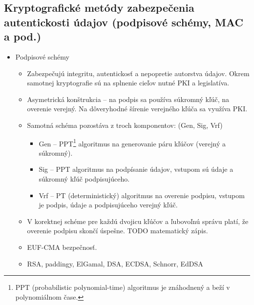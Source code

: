\documentclass[12pt,a4paper]{article}
\begin{document}
{    \subsection{Kryptografické metódy zabezpečenia autentickosti údajov (podpisové schémy, MAC a pod.)}
    \begin{itemize}
        \item Podpisové schémy
        \begin{itemize}
            \item Zabezpečujú integritu, autentickosť a nepopretie autorstva údajov. Okrem samotnej kryptografie sú na splnenie cieľov nutné PKI a legislatíva.
            \item Asymetrická konštrukcia -- na podpis sa používa súkromný kľúč, na overenie verejný. Na dôveryhodné šírenie verejného kľúča sa využíva PKI.
            \item Samotná schéma pozostáva z troch komponentov: (Gen, Sig, Vrf)
            \begin{itemize}
                \item Gen -- PPT\footnote{PPT (probabilistic polynomial-time) algoritmus je znáhodnený a beží v polynomiálnom čase.} algoritmus na generovanie páru kľúčov (verejný a súkromný).
                \item Sig -- PPT algoritmus na podpísanie údajov, vstupom sú údaje a súkromný kľúč podpisujúceho.
                \item Vrf -- PT (deterministický) algoritmus na overenie podpisu, vstupom je podpis, údaje a podpisujúceho verejný kľúč.
            \end{itemize}
            \item V korektnej schéme pre každú dvojicu kľúčov a ľubovoľnú správu platí, že overenie podpisu skončí úspešne. TODO matematický zápis.
            \item EUF-CMA bezpečnosť.
            \item RSA, paddingy, ElGamal, DSA, ECDSA, Schnorr, EdDSA
        \end{itemize}
    \end{itemize}
}
\end{document}
